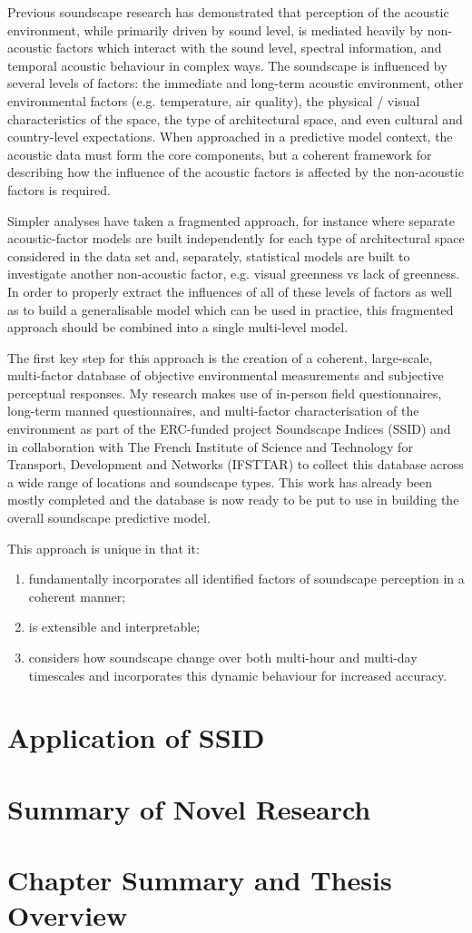     Previous soundscape research has demonstrated that perception of the acoustic environment, while primarily driven by sound level, is mediated heavily by non-acoustic factors which interact with the sound level, spectral information, and temporal acoustic behaviour in complex ways. The soundscape is influenced by several levels of factors: the immediate and long-term acoustic environment, other environmental factors (e.g. temperature, air quality), the physical / visual characteristics of the space, the type of architectural space, and even cultural and country-level expectations. When approached in a predictive model context, the acoustic data must form the core components, but a coherent framework for describing how the influence of the acoustic factors is affected by the non-acoustic factors is required.

    Simpler analyses have taken a fragmented approach, for instance where separate acoustic-factor models are built independently for each type of architectural space considered in the data set and, separately, statistical models are built to investigate another non-acoustic factor, e.g. visual greenness vs lack of greenness. In order to properly extract the influences of all of these levels of factors as well as to build a generalisable model which can be used in practice, this fragmented approach should be combined into a single multi-level model.

    The first key step for this approach is the creation of a coherent, large-scale, multi-factor database of objective environmental measurements and subjective perceptual responses. My research makes use of in-person field questionnaires, long-term manned questionnaires, and multi-factor characterisation of the environment as part of the ERC-funded project Soundscape Indices (SSID) and in collaboration with The French Institute of Science and Technology for Transport, Development and Networks (IFSTTAR) to collect this database across a wide range of locations and soundscape types. This work has already been mostly completed and the database is now ready to be put to use in building the overall soundscape predictive model.

    This approach is unique in that it:
    \begin{enumerate}
      \item fundamentally incorporates all identified factors of soundscape perception in a coherent manner;
      \item is extensible and interpretable;
      \item considers how soundscape change over both multi-hour and multi-day timescales and incorporates this dynamic behaviour for increased accuracy.
    \end{enumerate}

\section{Application of SSID}

\section{Summary of Novel Research}

\section{Chapter Summary and Thesis Overview}


